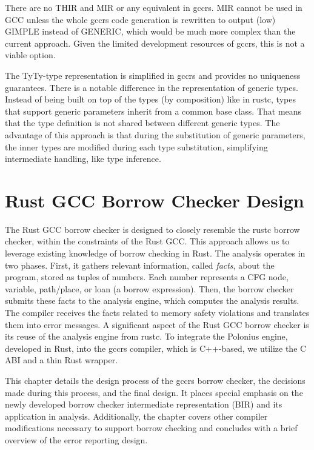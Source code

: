 \documentclass[
  11pt,
  twoside,symmetric]{report}
\begin{document}
There are no THIR and MIR or any equivalent in gccrs. MIR cannot be used
in GCC unless the whole gccrs code generation is rewritten to output
(low) GIMPLE instead of GENERIC, which would be much more complex than
the current approach. Given the limited development resources of gccrs,
this is not a viable option.

The TyTy-type representation is simplified in gccrs and provides no
uniqueness guarantees. There is a notable difference in the
representation of generic types. Instead of being built on top of the
types (by composition) like in rustc, types that support generic
parameters inherit from a common base class. That means that the type
definition is not shared between different generic types. The advantage
of this approach is that during the substitution of generic parameters,
the inner types are modified during each type substitution, simplifying
intermediate handling, like type inference.

\chapter{Rust GCC Borrow Checker
Design}\label{sec:rust-gcc-borrow-checker-design}

The Rust GCC borrow checker is designed to closely resemble the rustc
borrow checker, within the constraints of the Rust GCC. This approach
allows us to leverage existing knowledge of borrow checking in Rust. The
analysis operates in two phases. First, it gathers relevant information,
called \emph{facts}, about the program, stored as tuples of numbers.
Each number represents a CFG node, variable, path/place, or loan (a
borrow expression). Then, the borrow checker submits these facts to the
analysis engine, which computes the analysis results. The compiler
receives the facts related to memory safety violations and translates
them into error messages. A significant aspect of the Rust GCC borrow
checker is its reuse of the analysis engine from rustc. To integrate the
Polonius engine, developed in Rust, into the gccrs compiler, which is
C++-based, we utilize the C ABI and a thin Rust wrapper.

This chapter details the design process of the gccrs borrow checker, the
decisions made during this process, and the final design. It places
special emphasis on the newly developed borrow checker intermediate
representation (BIR) and its application in analysis. Additionally, the
chapter covers other compiler modifications necessary to support borrow
checking and concludes with a brief overview of the error reporting
design.
\end{document}
